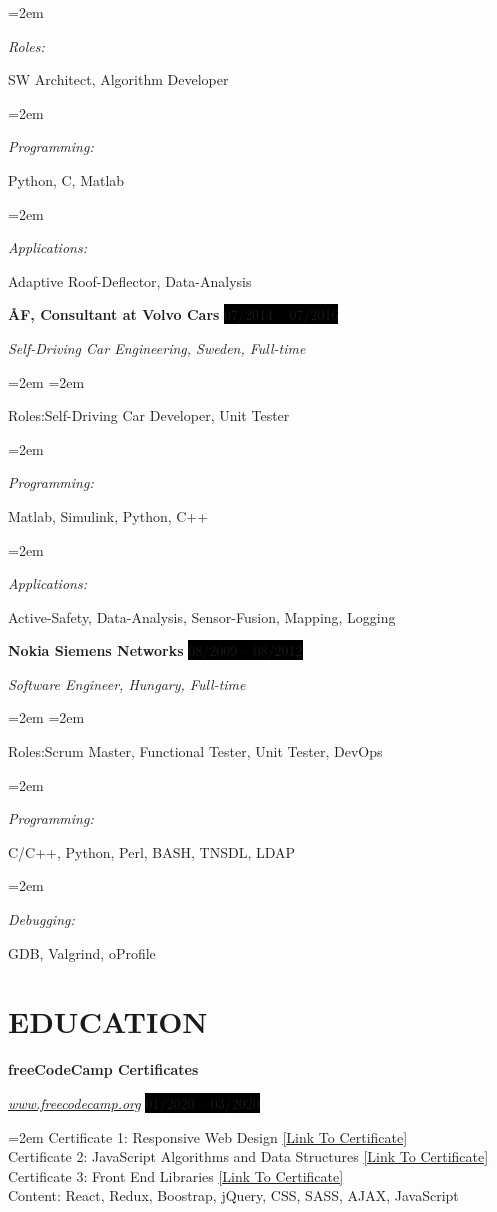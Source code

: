 \documentclass[paper=a4,fontsize=11pt]{scrartcl}	 			%
\newlength{\spacebox}
\newcommand{\sepspace}{\vspace*{1em}}			%
\newcommand{\NewPart}[1]{\section*{\uppercase{#1}}}
\newcommand{\PersonalEntry}[2]{
		\noindent\hangindent=2em\hangafter=0 		%
		\parbox{\spacebox}{						%
		\textit{#1}}								%
		\hspace{1.5em} #2 \par}					%
\newcommand{\SkillsEntry}[2]{						%
		\noindent\hangindent=2em\hangafter=0 		%
		\parbox{\spacebox}{						%
		\textit{#1}}								%
		\hspace{1.5em} #2 \par}					%
\newcommand{\EducationEntry}[4]{
		\noindent \textbf{#1} \par 					%
		\noindent \textit{#3} \hfill				%
		\colorbox{Black}{%
			\hfill\color{White}#2} \par				%
		\noindent\hangindent=2em\hangafter=0 \small #4 	%
		\normalsize \par
    }
\newcommand{\WorkEntry}[4]{					        %
		\noindent \textbf{#1} \hfill 				%
		\colorbox{Black}{\color{White}#2} \par		%
		\noindent \textit{#3} \par					%
		\noindent\hangindent=2em\hangafter=0 \small #4 	%
		\normalsize \par}
\begin{document}
\SkillsEntry{Roles:}{SW Architect, Algorithm Developer}

\SkillsEntry{Programming:}{Python, C, Matlab}

\SkillsEntry{Applications:}{Adaptive Roof-Deflector, Data-Analysis}


\sepspace

\WorkEntry{ÅF, Consultant at Volvo Cars}{07/2014 -- 07/2016}{Self-Driving Car Engineering, Sweden, Full-time}

\SkillsEntry{Roles:}{Self-Driving Car Developer, Unit Tester}

\SkillsEntry{Programming:}{Matlab, Simulink, Python, C++}

\SkillsEntry{Applications:}{Active-Safety, Data-Analysis, Sensor-Fusion, Mapping, Logging}


\sepspace

\WorkEntry{Nokia Siemens Networks}{08/2009 -- 08/2012}{Software Engineer, Hungary, Full-time}

\SkillsEntry{Roles:}{Scrum Master, Functional Tester, Unit Tester, DevOps}

\SkillsEntry{Programming:}{C/C++, Python, Perl, BASH, TNSDL, LDAP}


\SkillsEntry{Debugging:}{GDB, Valgrind, oProfile}


\clearpage

\NewPart{Education}{}

\EducationEntry{freeCodeCamp Certificates}{01/2020 -- 03/2020}
{\href{https://www.freecodecamp.org}{www.freecodecamp.org}}
{Certificate 1: Responsive Web Design
\href{https://www.freecodecamp.org/certification/fcc7d8027bd-7ee4-4ec3-816b-87c5087dab3c/responsive-web-design}{[Link To Certificate]}
\\
Certificate 2: JavaScript Algorithms and Data Structures
\href{https://www.freecodecamp.org/certification/fcc7d8027bd-7ee4-4ec3-816b-87c5087dab3c/javascript-algorithms-and-data-structures}{[Link To Certificate]}
\\
Certificate 3: Front End Libraries
\href{https://www.freecodecamp.org/certification/fcc7d8027bd-7ee4-4ec3-816b-87c5087dab3c/front-end-libraries}{[Link To Certificate]}
\\
Content: React, Redux, Boostrap, jQuery, CSS, SASS, AJAX, JavaScript
}
\end{document}

